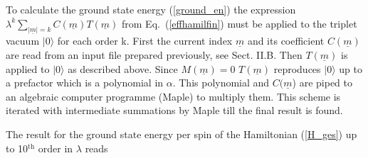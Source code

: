 To calculate the ground state energy (\ref{ground_en}) the expression 
$\lambda^k\sum_{|\underline{m}|=k} C(\underline{m})T(\underline{m})$ from
Eq.~(\ref{effhamilfin}) must be applied to the triplet vacuum $|0\rangle$
 for each order k.
First the current index $\underline{m}$ and its coefficient $C(\underline{m})$
are read from an input file prepared previously, see Sect. II.B.
Then $T(\underline{m})$  is applied to $|0\rangle$ as described above.
 Since $M(\underline{m})=0$
$T(\underline{m})$ reproduces $|0\rangle$ up to a prefactor
 which is a polynomial in $\alpha$. This polynomial and $C(\underline{m}$)
are piped  to an algebraic computer programme (Maple) 
to multiply them. This scheme 
is iterated with intermediate summations by Maple 
till the final result is found.

The result for the ground state energy per spin of the Hamiltonian
 (\ref{H_ges}) up to 10$^{\mbox{th}}$
 order in $\lambda$ reads
